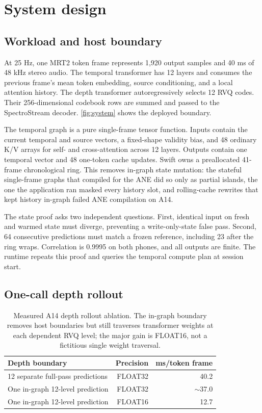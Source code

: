 \documentclass[10pt]{article}
\begin{document}
\section{System design}
\subsection{Workload and host boundary}
At 25 Hz, one MRT2 token frame represents 1,920 output samples and 40 ms of 48 kHz stereo audio. The temporal transformer has 12 layers and consumes the previous frame's mean token embedding, source conditioning, and a local attention history. The depth transformer autoregressively selects 12 RVQ codes. Their 256-dimensional codebook rows are summed and passed to the SpectroStream decoder. \cref{fig:system} shows the deployed boundary.

The temporal graph is a pure single-frame tensor function. Inputs contain the current temporal and source vectors, a fixed-shape validity bias, and 48 ordinary K/V arrays for self- and cross-attention across 12 layers. Outputs contain one temporal vector and 48 one-token cache updates. Swift owns a preallocated 41-frame chronological ring. This removes in-graph state mutation: the stateful single-frame graphs that compiled for the ANE did so only as partial islands, the one the application ran masked every history slot, and rolling-cache rewrites that kept history in-graph failed ANE compilation on A14.

The state proof asks two independent questions. First, identical input on fresh and warmed state must diverge, preventing a write-only-state false pass. Second, 64 consecutive predictions must match a frozen reference, including 23 after the ring wraps. Correlation is 0.9995 on both phones, and all outputs are finite. The runtime repeats this proof and queries the temporal compute plan at session start.

\subsection{One-call depth rollout}

\begin{table}[H]
\centering
\small
\caption{Measured A14 depth rollout ablation. The in-graph boundary removes host
boundaries but still traverses transformer weights at each dependent RVQ level;
the major gain is FLOAT16, not a fictitious single weight traversal.}
\label{tab:depth}
\begin{tabular}{@{}lrr@{}}
\toprule
Depth boundary & Precision & ms/token frame \\
\midrule
12 separate full-pass predictions & FLOAT32 & 40.2 \\
One in-graph 12-level prediction & FLOAT32 & $\sim$37.0 \\
One in-graph 12-level prediction & FLOAT16 & 12.7 \\
\bottomrule
\end{tabular}
\end{table}
\end{document}
